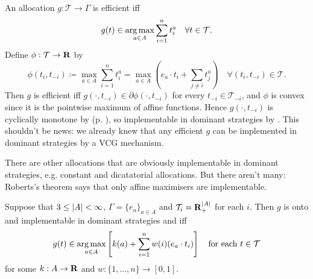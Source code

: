 \documentclass[11pt,letterpaper,reqno,oneside]{article}
\begin{document}
An allocation $g : \mathcal{T} \to \Gamma$ is efficient iff
%
\begin{equation*}
	g(t) \in \argmax_{a \in A} \sum_{i=1}^n t^a_i 
	\quad\forall t \in \mathcal{T} .
\end{equation*}
%
Define $\phi : \mathcal{T} \to \R$ by
%
\begin{equation*}
	\phi(t_i,t_{-i}) 
	\coloneqq \max_{a \in A} \sum_{i=1}^n t^a_i
	= \max_{a \in A} \left( e_a \cdot t_i + \sum_{j \neq i} t^a_j \right) 
	\quad\forall (t_i,t_{-i}) \in \mathcal{T} .
\end{equation*}
%
Then $g$ is efficient iff $g(\cdot,t_{-i}) \in \partial \phi(\cdot,t_{-i})$ for every $t_{-i} \in \mathcal{T}_{-i}$, and $\phi$ is convex since it is the pointwise maximum of affine functions. Hence $g(\cdot,t_{-i})$ is cyclically monotone by  (p. \pageref{theorem:convex_FTC}), so implementable in dominant strategies by . This shouldn't be news: we already knew that any efficient $g$ can be implemented in dominant strategies by a VCG mechanism.


There are other allocations that are obviously implementable in dominant strategies, e.g. constant and dicatatorial allocations. But there aren't many: Roberts's theorem says that only affine maximisers are implementable.
%
\begin{theorem}
	Suppose that $3 \leq \abs*{A} < \infty$, $\Gamma = \{ e_a \}_{a \in A}$ and $\mathcal{T}_i = \R_+^{\abs*{A}}$ for each $i$. Then $g$ is onto and implementable in dominant strategies and iff
	\begin{equation*}
		g(t) \in \argmax_{a \in A} \left[ k(a) + \sum_{i=1}^n w(i) (e_a \cdot t_i) \right]
		\quad\text{for each $t \in \mathcal{T}$}
	\end{equation*}
	for some $k : A \to \R$ and $w : \{1,\dots,n\} \to [0,1]$.
\end{theorem}
\end{document}
